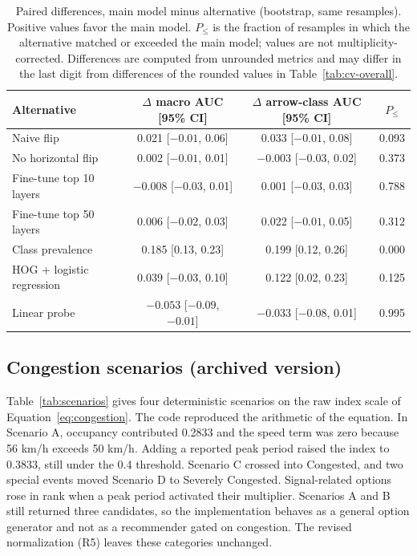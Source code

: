 \documentclass[11pt]{article}
\begin{document}
\begin{table}[!htbp]
\centering\small
\caption{Paired differences, main model minus alternative (bootstrap, same resamples). Positive values favor the main model. $P_{\le}$ is the fraction of resamples in which the alternative matched or exceeded the main model; values are not multiplicity-corrected. Differences are computed from unrounded metrics and may differ in the last digit from differences of the rounded values in Table~\ref{tab:cv-overall}.}
\label{tab:cv-paired}
\begin{tabular}{lccc}
\toprule
Alternative & $\Delta$ macro AUC [95\% CI] & $\Delta$ arrow-class AUC [95\% CI] & $P_{\le}$ \\
\midrule
Naive flip & 0.021 [$-0.01$, 0.06] & 0.033 [$-0.01$, 0.08] & 0.093 \\
No horizontal flip & 0.002 [$-0.01$, 0.01] & $-0.003$ [$-0.03$, 0.02] & 0.373 \\
Fine-tune top 10 layers & $-0.008$ [$-0.03$, 0.01] & 0.001 [$-0.03$, 0.03] & 0.788 \\
Fine-tune top 50 layers & 0.006 [$-0.02$, 0.03] & 0.022 [$-0.01$, 0.05] & 0.312 \\
\midrule
Class prevalence & 0.185 [0.13, 0.23] & 0.199 [0.12, 0.26] & 0.000 \\
HOG + logistic regression & 0.039 [$-0.03$, 0.10] & 0.122 [0.02, 0.23] & 0.125 \\
Linear probe & $-0.053$ [$-0.09$, $-0.01$] & $-0.033$ [$-0.08$, 0.01] & 0.995 \\
\bottomrule
\end{tabular}
\end{table}

\subsection{Congestion scenarios (archived version)}
\label{sec:congestion-scenarios}
Table~\ref{tab:scenarios} gives four deterministic scenarios on the raw index scale of Equation~\ref{eq:congestion}. The code reproduced the arithmetic of the equation. In Scenario A, occupancy contributed 0.2833 and the speed term was zero because 56 km/h exceeds 50 km/h. Adding a reported peak period raised the index to 0.3833, still under the 0.4 threshold. Scenario C crossed into Congested, and two special events moved Scenario D to Severely Congested. Signal-related options rose in rank when a peak period activated their multiplier. Scenarios A and B still returned three candidates, so the implementation behaves as a general option generator and not as a recommender gated on congestion. The revised normalization (R5) leaves these categories unchanged.
\end{document}
